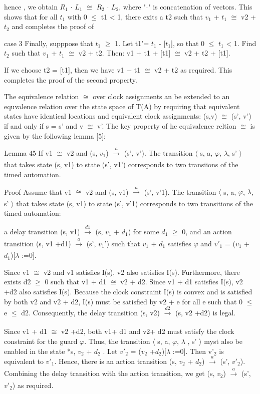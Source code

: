 \documentclass{article}
\begin{document}
	hence , we obtain $R_1$ $\cdot$ $L_1$ $\cong$ $R_2$ $\cdot$ $L_2$, where "$\cdot$" is concatenation of vectors. This shows that for all $t_1$ with 0 $\leq$ t1 < 1, there exits a t2 such that $v_1$ + $t_1$ $\cong$ v2 + $t_2$ and completes the proof of 
	
	
	
	case 3
	Finally, supppose that $t_1$ $\geq$ 1. Let t1'= $t_1$ - [$t_1$], so that 0 $\leq$ $t_1$ < 1. Find $t_2$ such that $v_1$ + $t_1$ $\cong$ v2 + t2. Then:
	v1 + t1 + [t1]  $\cong$ v2 + t2 + [t1].
	
	If we choose t2 = [t1], then we have v1 + t1 $\cong$ v2 + t2 as required. This completes the proof of the second property.
	
	The equivalence relation $\cong$ over clock assignments an be extended to an equvalence relation over the state space of T(A) by requiring that equivalent states have identical locations and equivalent clock assignments: (s,v) $\cong$ (s', v') if and only if s = s' and v $\cong$ v'. The key property of he equivalence reltion $\cong$ is given by the following lemma [5]:
	\cite[p~278]{clarkmodelchecking}
	
	Lemma 45
	If v1 $\cong$ v2 and (s, $v_1$)  $\xrightarrow[]{a}$ (s', v'). The transition $\langle$ s, a, $\varphi$, $\lambda$, s' $\rangle$  that takes state (s, v1) to state (s', v1') corresponds to two transiions of the timed automation.
	
	Proof
	Assume that v1 $\cong$ v2 and (s, v1)  $\xrightarrow[]{a}$ (s', v'1). The transition $\langle$ s, a, $\varphi$, $\lambda$, s' $\rangle$ that takes state (s, v1) to state (s', v'1) corresponds to two transitions of the timed automation:
	
	a delay transition (s, v1)  $\xrightarrow[]{d1}$ (s, $v_1$ + $d_1$) for some $d_1$ $\geq$ 0, and
	an action transition   (s, v1 +d1)  $\xrightarrow[]{a}$ (s', $v_1$') such that $v_1$ + $d_1$ satisfies $\varphi$ and $v'_1$ = ($v_1$ + $d_1$)[$\lambda$ :=0].
	
	
	
	Since v1 $\cong$ v2 and v1 satisfies I(s), v2 also satisfies I(s). Furthermore, there exists d2 $\geq$ 0 such that v1 + d1 $\cong$ v2 + d2. Since v1 + d1 satisfies I(s), v2 +d2 also satisfies I(s). Because the clock constraint I(s) is convex and is satisfied by both v2 and v2 + d2, I(s) must be satisfied by v2 + e for all e such that 0 $\leq$ e $\leq$ d2. Consequently, the delay transition (s, v2)  $\xrightarrow[]{d2}$ (s, v2 +d2) is legal.
	
	Since v1 + d1 $\cong$ v2 +d2, both v1+ d1 and v2+ d2 must satisfy the clock constraint for the guard $\varphi$. Thus, the transition $\langle$ s, a, $\varphi$, $\lambda$ , s' $\rangle$ myst also be enabled in the state  *s, $v_2$ + $d_2$
	. Let $v'_2$ = ($v_2$ +$d_2$)[$\lambda$ :=0]. Then v'$_2$ is equivalent to $v'_1$. Hence, there is an action transition (s, $v_2$ + $d_2$)  $\xrightarrow[]{a}$  (s', $v'_2$). Combining the delay transition with the action transition, we get (s, $v_2$)  $\xrightarrow[]{a}$ (s', $v'_2$) as required.
	
\end{document}
